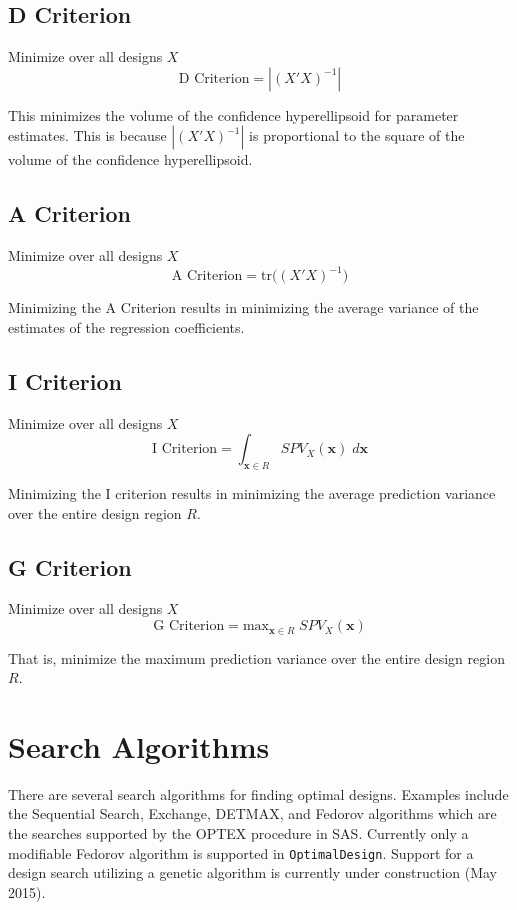 \documentclass{article}\usepackage[]{graphicx}\usepackage[]{color}
\begin{document}
\subsection{D Criterion}
Minimize over all designs $X$
$$ \mbox{D Criterion} = |(X'X)^{-1}| $$

This minimizes the volume of the confidence hyperellipsoid for parameter estimates. This is because $|(X'X)^{-1}|$ is proportional to the square of the volume of the confidence hyperellipsoid.

\subsection{A Criterion}
Minimize over all designs $X$
$$ \mbox{A Criterion} = \mbox{tr} \big( (X'X)^{-1} \big) $$

Minimizing the A Criterion results in minimizing the average variance of the estimates of the regression coefficients.

\subsection{I Criterion}
Minimize over all designs $X$
$$ \mbox{I Criterion} = \int_{\textbf{x} \in R} SPV_X(\textbf{x}) \; d\textbf{x}$$

Minimizing the I criterion results in minimizing the average prediction variance over the entire design region $R$.

\subsection{G Criterion}
Minimize over all designs $X$
$$ \mbox{G Criterion} = \mbox{max}_{\textbf{x} \in R} \; SPV_X(\textbf{x})$$

That is, minimize the maximum prediction variance over the entire design region $R$.

\section{Search Algorithms}

There are several search algorithms for finding optimal designs. Examples include the Sequential Search, Exchange, DETMAX, and Fedorov algorithms which are the searches supported by the OPTEX procedure in SAS. Currently only a modifiable Fedorov algorithm is supported in \texttt{OptimalDesign}. Support for a design search utilizing a genetic algorithm is currently under construction (May 2015).
\end{document}
